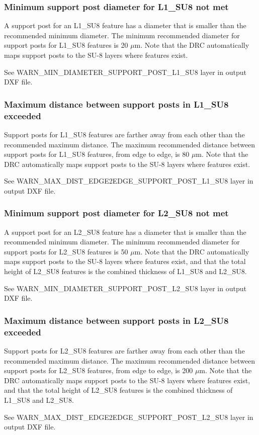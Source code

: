 \documentclass[twoside]{article}
\begin{document}
\subsubsection{Minimum support post diameter for L1\_SU8 not met}
\par A support post for an L1\_SU8 feature has a diameter that is smaller than
the recommended minimum diameter. The minimum recommended diameter for support
posts for L1\_SU8 features is 20 $\mu$m. Note that the DRC automatically maps
support posts to the SU-8 layers where features exist.  \par See
WARN\_MIN\_DIAMETER\_SUPPORT\_POST\_L1\_SU8 layer in output DXF file.

\subsubsection{Maximum distance between support posts in L1\_SU8 exceeded}
Support posts for L1\_SU8 features are farther away from each other than the
recommended maximum distance. The maximum recommended distance between support
posts for L1\_SU8 features, from edge to edge, is 80 $\mu$m. Note that the DRC
automatically maps support posts to the SU-8 layers where features exist.  \par
See WARN\_MAX\_DIST\_EDGE2EDGE\_SUPPORT\_POST\_L1\_SU8 layer in output DXF file.

\subsubsection{Minimum support post diameter for L2\_SU8 not met}
\par A support post for an L2\_SU8 feature has a diameter that is smaller than
the recommended minimum diameter. The minimum recommended diameter for support
posts for L2\_SU8 features is 50 $\mu$m. Note that the DRC automatically maps
support posts to the SU-8 layers where features exist, and that the total height
of L2\_SU8 features is the combined thickness of L1\_SU8 and L2\_SU8.  \par See
WARN\_MIN\_DIAMETER\_SUPPORT\_POST\_L2\_SU8 layer in output DXF file.

\subsubsection{Maximum distance between support posts in L2\_SU8 exceeded}
Support posts for L2\_SU8 features are farther away from each other than the
recommended maximum distance. The maximum recommended distance between support
posts for L2\_SU8 features, from edge to edge, is 200 $\mu$m. Note that the DRC
automatically maps support posts to the SU-8 layers where features exist, and
that the total height of L2\_SU8 features is the combined thickness of L1\_SU8
and L2\_SU8.  \par See WARN\_MAX\_DIST\_EDGE2EDGE\_SUPPORT\_POST\_L2\_SU8 layer
in output DXF file.
\end{document}
